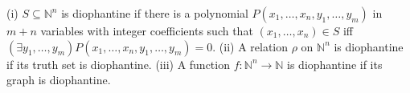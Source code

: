 (i) $S \subseteq \mathbb{N}^n$ is diophantine if there is a polynomial $P(x_1, \ldots, x_n, y_1, \ldots, y_m)$ in $m+n$ variables with integer coefficients such that $(x_1, \ldots, x_n) \in S$ iff $(\exists y_1, \ldots, y_m) P(x_1, \ldots, x_n, y_1, \ldots, y_m) = 0$.
(ii) A relation $\rho$ on $\mathbb{N}^n$ is diophantine if its truth set is diophantine.
(iii) A function $f: \mathbb{N}^n \to \mathbb{N}$ is diophantine if its graph is diophantine.
